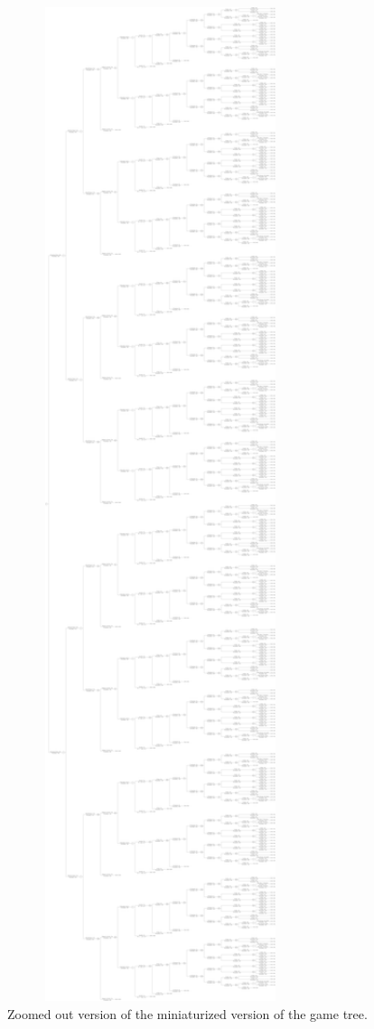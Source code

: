 \documentclass{article}
\begin{document}
 \begin{figure}[t]
  \centering
  \includegraphics[width=0.8\textwidth,height=0.3\textheight]{../Figures/smalltree.pdf}
  \caption{Zoomed out version of the miniaturized version of the game tree.}
  \label{fig:smalltree.pdf}
\end{figure}
\end{document}
